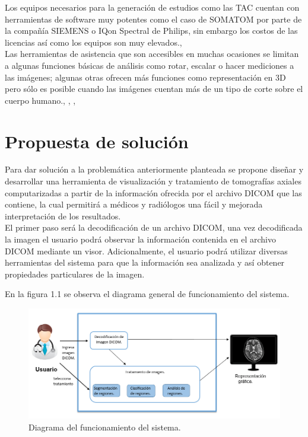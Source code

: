 \documentclass[12pt]{report}
\begin{document}
Los equipos necesarios para la generación de estudios como las TAC cuentan con herramientas de software muy potentes como el caso de SOMATOM por parte de la compañía SIEMENS o IQon Spectral de Philips, sin embargo los costos de las licencias así como los equipos son muy elevados.\cite{guia}, \cite{guiad}\\

Las herramientas de asistencia que son accesibles en muchas ocasiones se limitan a algunas funciones básicas de análisis como rotar, escalar o hacer mediciones a las imágenes; algunas otras ofrecen más funciones como representación en 3D pero sólo es posible cuando las imágenes  cuentan más de un tipo de corte sobre el cuerpo humano.\cite{occi}, \cite{nifty}, \cite{osirix}, \cite{3dim}\\

\section{Propuesta de solución}
Para dar solución a la problemática anteriormente planteada se propone diseñar y desarrollar una herramienta de visualización y tratamiento de tomografías axiales computarizadas a partir de la información ofrecida por el archivo DICOM que las contiene, la cual permitirá a médicos y radiólogos una fácil y mejorada interpretación de  los resultados.\\

El primer paso será la decodificación de un archivo DICOM, una vez decodificada la imagen el usuario podrá observar la información contenida en el archivo DICOM mediante un visor. Adicionalmente, el usuario podrá utilizar diversas herramientas del sistema para que la información sea analizada y así obtener propiedades particulares de la imagen.

En la figura 1.1 se observa el diagrama general de funcionamiento del sistema.
\begin{figure}[H]
\centering
\includegraphics[width = 12 cm, height = 7 cm]{diagramageneral}
\caption{Diagrama del funcionamiento del sistema.}
\end{figure}
\end{document}
